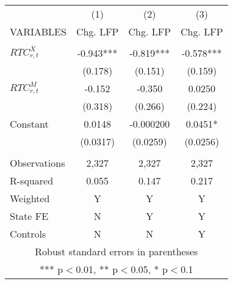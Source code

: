 \begin{tabular}{lccc} \hline
 & (1) & (2) & (3) \\
VARIABLES & Chg. LFP & Chg. LFP & Chg. LFP \\ \hline
 &  &  &  \\
$ RTC_{r,t}^X$ & -0.943*** & -0.819*** & -0.578*** \\
 & (0.178) & (0.151) & (0.159) \\
$ RTC_{r,t}^M$ & -0.152 & -0.350 & 0.0250 \\
 & (0.318) & (0.266) & (0.224) \\
Constant & 0.0148 & -0.000200 & 0.0451* \\
 & (0.0317) & (0.0259) & (0.0256) \\
 &  &  &  \\
Observations & 2,327 & 2,327 & 2,327 \\
R-squared & 0.055 & 0.147 & 0.217 \\
Weighted & Y & Y & Y \\
State FE & N & Y & Y \\
 Controls & N & N & Y \\ \hline
\multicolumn{4}{c}{ Robust standard errors in parentheses} \\
\multicolumn{4}{c}{ *** p$<$0.01, ** p$<$0.05, * p$<$0.1} \\
\end{tabular}

